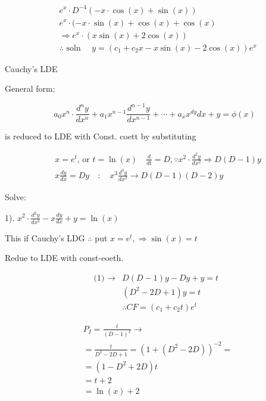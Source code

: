 \documentclass[12pt, a4paper]{article}
\begin{document}
$$
\begin{aligned}
	 & e^{x} \cdot D^{-4}(-x \cdot \cos(x)+\sin(x))                                          \\
	 & e^{x} \cdot(-x \cdot \sin(x)+\cos(x)+\cos(x)                                          \\
	 & \Rightarrow e^{x} \cdot(x \sin(x)+2 \cos(x))                                          \\
	 & \therefore \text{ soln } \quad y=\left(c_{1}+c_{2} x-x \sin(x)-2 \cos(x)\right) e^{x}
\end{aligned}
$$

	Cauchy's LDE

	General form:

$$
a_{0} x^{n} \cdot \frac{d^{n} y}{d x^{n}}+a_{1} x^{n-1} \frac{d^{n-1} y}{d x^{n-1}}+\cdots+a_{x} x^{d y} d x+y=\phi(x)
$$

	is reduced to LDE with Const. coett by substituting

$$
\begin{aligned}
	 & x=e^{t} \text{, or } t=\ln (x) \quad \frac{d}{d t}=D, \because x^2 \cdot \frac{d^{2} y}{d x^2 } \Rightarrow D(D-1) y \\
	 & x \frac{d y}{d x}=D y \quad: \quad x^{3} \frac{d^{3} y}{d x^{3}} \rightarrow D(D-1)(D-2) y
\end{aligned}
$$

	Solve:

	1). $x^2 \cdot \frac{d^{2} y}{d x^2 }-x \frac{d y}{d x}+y=\ln (x)$

	This if Cauchy's LDG $\therefore$ put $x=e^{t}, \Rightarrow \sin(x)=t$

	Redue to LDE with const-eoeth.

$$
\begin{aligned}
	\text{ (1) } \rightarrow & D(D-1) y-D y+y=t                                \\
	                         & \left(D^{2}-2 D+1\right) y=t                    \\
	                         & \therefore C F=\left(c_{1}+c_{2} t\right) e^{t}
\end{aligned}
$$

$$
\begin{aligned}
	 & P_{I}=\frac{t}{(D-1)^{2}} \rightarrow                               \\
	 & = \frac{t}{D^{2}-2 D+1}=\left(1+\left(D^{2}-2 D\right)\right)^{-2}= \\
	 & =\left(1-D^{2}+2 D\right) t                                         \\
	 & =t+2                                                                \\
	 & =\ln (x)+2
\end{aligned}
$$
\end{document}
